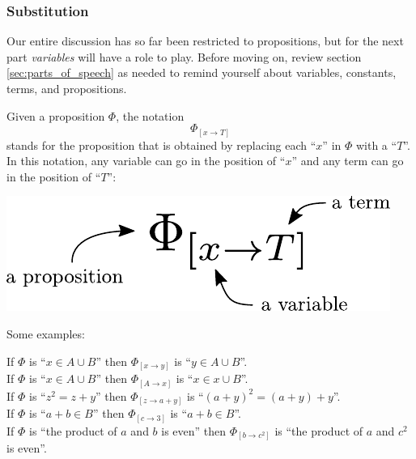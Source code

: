 \documentclass[12pt]{article}
\newcommand{\SUBST}[3]{{#1}_{[{#2}\rightarrow{#3}]}}
\newcounter{exercise}[subsubsection]
\newcounter{rule}
\newcommand{\indented}[1]{\begin{adjustwidth}{1em}{}#1\end{adjustwidth}}
\def\pA{\Phi}
\begin{document}








\subsubsection{Substitution}

Our entire discussion has so far been restricted to propositions, but for the next part \emph{variables} will have a role to play.
Before moving on, review section
\ref{sec:parts_of_speech} as needed to remind yourself about variables, constants, terms, and propositions.

\newcommand{\eg}[4]{If $\pA$ is ``#1'' then $\SUBST{\pA}{#2}{#3}$ is ``#4''.}
\def\lsp{\\[0.4em]}

Given a proposition $\pA$, the notation
$$
\SUBST{\pA}{x}{T}
$$
stands for the proposition that is obtained by replacing each ``$x$'' in $\pA$ with a ``$T$''.
In this notation, any variable can go in the position of ``$x$'' and any term can go in the position of ``$T$'':
\begin{center}\includegraphics[scale=0.8]{subst.pdf}\end{center}
Some examples:
\indented{
\eg{$x\in A\cup B$}{x}{y}{$y\in A\cup B$}\lsp
\eg{$x\in A\cup B$}{A}{x}{$x\in x\cup B$}\lsp
\eg{$z^2=z+y$}{z}{a+y}{$(a+y)^2=(a+y)+y$}\lsp
\eg{$a+b\in B$}{c}{3}{$a+b\in B$}\lsp
\eg{the product of $a$ and $b$ is even}{b}{c^2}{the product of $a$ and $c^2$ is even}
}
\end{document}
